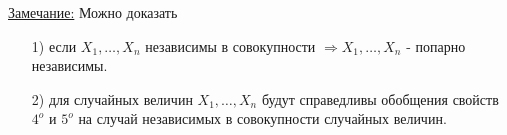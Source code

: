 \underline{Замечание:} Можно доказать \\
\begin{enumerate}
\item[1)] если $X_1, \ldots, X_n$ независимы в совокупности $\Rightarrow X_1, \ldots, X_n$ - попарно независимы.

\item[2)] для случайных величин $X_1, \ldots, X_n$ будут справедливы обобщения свойств $4^o$ и $5^o$ на случай независимых в совокупности случайных величин.
\end{enumerate}


















